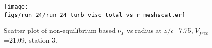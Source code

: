 \begin{figure}[H]
\centering
\texttt{[image: figs/run\_24/run\_24\_turb\_visc\_total\_vs\_r\_meshscatter]}
\caption{Scatter plot of non-equilibrium based $\nu_T$ vs radius at $z/c$=7.75, $V_{free}$=21.09, station 3.}
\label{fig:run_24_turb_visc_total_vs_r_meshscatter}
\end{figure}


